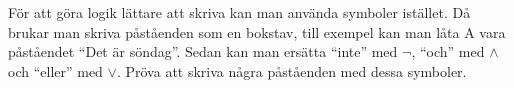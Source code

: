 \begin{problem}[Extra]
	För att göra logik lättare att skriva kan man använda symboler istället. Då brukar man skriva påståenden som en bokstav, till exempel kan man låta A vara påståendet ``Det är söndag''. Sedan kan man ersätta ``inte'' med \(\lnot\), ``och'' med \(\land\) och ``eller'' med \(\lor\). Pröva att skriva några påståenden med dessa symboler.
\end{problem}










